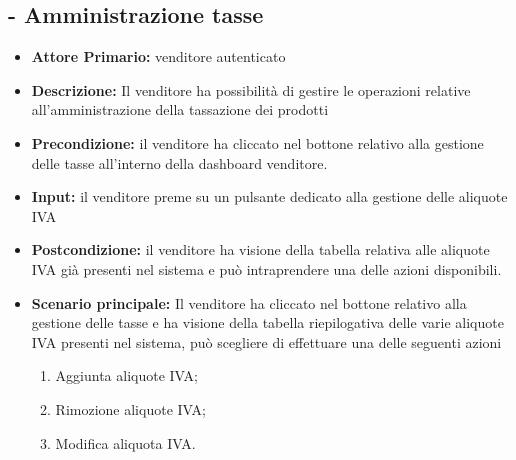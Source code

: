 \subsection{ - Amministrazione tasse}
\begin{itemize}
    \item \textbf{Attore Primario:} venditore autenticato
    \item \textbf{Descrizione:} Il venditore ha possibilità di gestire le operazioni relative all’amministrazione della tassazione dei prodotti 
    \item \textbf{Precondizione:} il venditore ha cliccato nel bottone relativo alla gestione delle tasse all’interno della dashboard venditore.
    \item \textbf{Input:} il venditore preme su un pulsante dedicato alla gestione delle aliquote IVA
    \item \textbf{Postcondizione:} il venditore ha visione della tabella relativa alle aliquote IVA già presenti nel sistema e può intraprendere una delle azioni disponibili.
    \item \textbf{Scenario principale:} Il venditore ha cliccato nel bottone relativo alla gestione delle tasse e ha visione della tabella riepilogativa delle varie aliquote IVA presenti nel sistema, può scegliere di effettuare una delle seguenti azioni 
    \begin{enumerate}
        \item Aggiunta aliquote IVA;
        \item Rimozione aliquote IVA;
        \item Modifica aliquota IVA.
    \end{enumerate}
\end{itemize}

\stepsubUserCase
